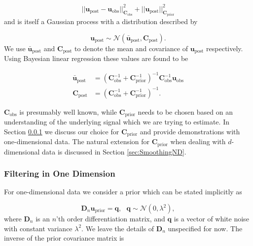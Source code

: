 \documentclass[10pt,a4paper]{article}
\begin{document}
\begin{equation}\label{eq:Objective}
||\mathbf{u}_\mathrm{post} - \mathbf{u}_\mathrm{obs}||_{\mathbf{C}_\mathrm{obs}}^2 + 
||\mathbf{u}_\mathrm{post}||_{\mathbf{C}_\mathrm{prior}}^2
\end{equation}
and is itself a Gaussian process with a distribution described by

\begin{equation}
  \mathbf{u}_\mathrm{post} \sim \mathcal{N}(\mathbf{\bar{u}}_\mathrm{post},\mathbf{C}_\mathrm{post}).
\end{equation}
We use $\mathbf{\bar{u}}_\mathrm{post}$ and $\mathbf{C}_\mathrm{post}$ to denote the mean and covariance of $\mathbf{u}_\mathrm{post}$ respectively.  Using Bayesian linear regression \citep{Tarantola2005} these values are found to be  

\begin{equation}\label{eq:GeneralSolution}
\begin{split}
  \mathbf{\bar{u}}_\mathrm{post} &= (\mathbf{C}_\mathrm{obs}^{-1} + 
                            \mathbf{C}_\mathrm{prior}^{-1})^{-1}
                            \mathbf{C}_\mathrm{obs}^{-1} \mathbf{u}_\mathrm{obs}
\\
\mathbf{C}_\mathrm{post} &= (\mathbf{C}_\mathrm{obs}^{-1} + 
                             \mathbf{C}_\mathrm{prior}^{-1})^{-1}.                          
\end{split}
\end{equation}
 
$\mathbf{C}_\mathrm{obs}$ is presumably well known, while $\mathbf{C}_\mathrm{prior}$ needs to be chosen based on an understanding of the underlying signal which we are trying to estimate. In Section \ref{sec:Smoothing1D} we discuss our choice for $\mathbf{C}_\mathrm{prior}$ and provide demonstrations with one-dimensional data.  The natural extension for $\mathbf{C}_\mathrm{prior}$ when dealing with $d$-dimensional data is discussed in Section \ref{sec:SmoothingND}.  

\subsubsection{Filtering in One Dimension}\label{sec:Smoothing1D}
For one-dimensional data we consider a prior which can be stated implicitly as

\begin{equation}\label{eq:ImplicitPrior1D}
  \mathbf{D}_{n} \mathbf{u}_\mathrm{prior} = \mathbf{q}, \ \ \ \mathbf{q} \sim \mathcal{N}(0,\lambda^2),
\end{equation}  
where $\mathbf{D}_n$ is an $n$'th order differentiation matrix, and $\mathbf{q}$ is a vector of white noise with constant variance $\lambda^2$. We leave the details of $\mathbf{D}_{n}$ unspecified for now. The inverse of the prior covariance matrix is
\end{document}
